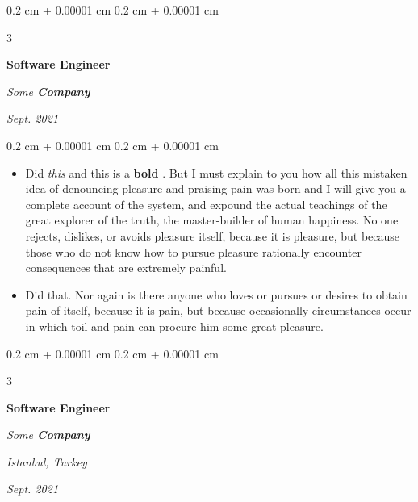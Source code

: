 \documentclass[10pt, letterpaper]{article}
\newenvironment{highlights}{
    \begin{itemize}[
        topsep=0.10 cm,
        parsep=0.10 cm,
        partopsep=0pt,
        itemsep=0pt,
        leftmargin=0.4 cm + 10pt + 0.6 cm
    ]
}{
    \end{itemize}
} %
\newenvironment{onecolentry}{
    \begin{adjustwidth}{
        0.2 cm + 0.00001 cm
    }{
        0.2 cm + 0.00001 cm
    }
}{
    \end{adjustwidth}
} %
\newenvironment{threecolentry}[3][]{
    \onecolentry
    \def\thirdColumn{#3}
    \setcolumnwidth{0.6 cm, \fill, 4.5 cm}
    \begin{paracol}{3}
    #2 \switchcolumn
}{
    \switchcolumn \raggedleft \thirdColumn
    \end{paracol}
    \endonecolentry
} %
\let\hrefWithoutArrow\href
\renewcommand{\href}[2]{\hrefWithoutArrow{#1}{\mbox{\ifthenelse{\equal{#2}{}}{ }{#2 }\raisebox{.15ex}{\footnotesize \faExternalLink*}}}}
\begin{document}
        \vspace{0.2 cm-3px}

        \begin{threecolentry}{
            \vspace*{\fill}
            \textbullet
            \vspace*{3px}
            \vspace*{\fill}
        }{
            
            
        \textit{Sept. 2021}}
            \textbf{Software Engineer}
            
            \textit{Some \textbf{Company}}
        \end{threecolentry}

        \vspace{0.10 cm-3px}
        \begin{onecolentry}
            \begin{highlights}
                \item Did \textit{this} and this is a \textbf{bold} \href{https://example.com}{link}. But I must explain to you how all this mistaken idea of denouncing pleasure and praising pain was born and I will give you a complete account of the system, and expound the actual teachings of the great explorer of the truth, the master-builder of human happiness. No one rejects, dislikes, or avoids pleasure itself, because it is pleasure, but because those who do not know how to pursue pleasure rationally encounter consequences that are extremely painful.
                \item Did that. Nor again is there anyone who loves or pursues or desires to obtain pain of itself, because it is pain, but because occasionally circumstances occur in which toil and pain can procure him some great pleasure.
            \end{highlights}
        \end{onecolentry}


        \vspace{0.2 cm-3px}

        \begin{threecolentry}{
            \vspace*{\fill}
            \textbullet
            \vspace*{3px}
            \vspace*{\fill}
        }{
        \textit{Istanbul, Turkey}    
            
        \textit{Sept. 2021}}
            \textbf{Software Engineer}
            
            \textit{Some \textbf{Company}}
        \end{threecolentry}
\end{document}
